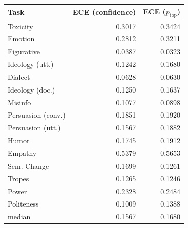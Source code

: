 \begin{tabular}{lrr}
\toprule
Task & ECE (confidence) & ECE ($p_{\mathrm{top}}$) \\
\midrule
Toxicity & 0.3017 & 0.3424 \\
Emotion & 0.2812 & 0.3211 \\
Figurative & 0.0387 & 0.0323 \\
Ideology (utt.) & 0.1242 & 0.1680 \\
Dialect & 0.0628 & 0.0630 \\
Ideology (doc.) & 0.1250 & 0.1637 \\
Misinfo & 0.1077 & 0.0898 \\
Persuasion (conv.) & 0.1851 & 0.1920 \\
Persuasion (utt.) & 0.1567 & 0.1882 \\
Humor & 0.1745 & 0.1912 \\
Empathy & 0.5379 & 0.5653 \\
Sem. Change & 0.1699 & 0.1261 \\
Tropes & 0.1265 & 0.1246 \\
Power & 0.2328 & 0.2484 \\
Politeness & 0.1009 & 0.1388 \\
median & 0.1567 & 0.1680 \\
\bottomrule
\end{tabular}
